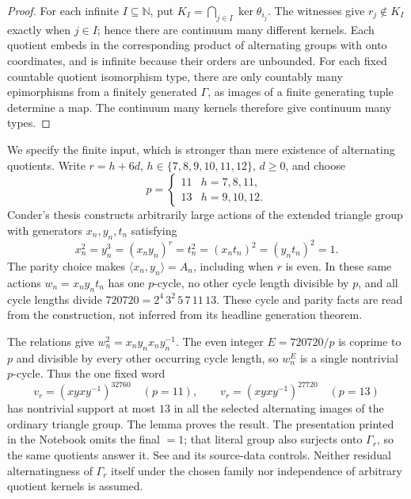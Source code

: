 \begin{proof}
For each infinite \(I\subseteq\mathbb N\), put
\(K_I=\bigcap_{j\in I}\ker\theta_{i_j}\).
The witnesses give \(r_j\notin K_I\) exactly when \(j\in I\);
hence there are continuum many different kernels.
Each quotient embeds in the corresponding product of alternating
groups with onto coordinates, and is infinite because their orders
are unbounded. For each fixed countable quotient isomorphism type,
there are only countably many epimorphisms from a finitely generated
\(\Gamma\), as images of a finite generating tuple determine a map.
The continuum many kernels therefore give continuum many types.
\end{proof}

We specify the finite input, which is stronger than mere existence
of alternating quotients.
Write \(r=h+6d\), \(h\in\{7,8,9,10,11,12\}\), \(d\ge0\), and choose
\[
 p=\begin{cases}11&h=7,8,11,\\13&h=9,10,12.\end{cases}
\]
Conder's thesis \cite[Chapter~5, pp.~117--120]{conder-thesis}
constructs arbitrarily large actions of the extended triangle group
with generators \(x_n,y_n,t_n\) satisfying
\[
 x_n^2=y_n^3=(x_ny_n)^r=t_n^2=(x_nt_n)^2=(y_nt_n)^2=1.
\]
The parity choice makes \(\langle x_n,y_n\rangle=A_n\), including
when \(r\) is even. In these same actions \(w_n=x_ny_nt_n\) has
one \(p\)-cycle, no other cycle length divisible by \(p\), and all
cycle lengths divide \(720720=2^4\,3^2\,5\,7\,11\,13\).
These cycle and parity facts are read from the construction,
not inferred from its headline generation theorem.

The relations give \(w_n^2=x_ny_nx_ny_n^{-1}\).
The even integer \(E=720720/p\) is coprime to \(p\) and divisible
by every other occurring cycle length, so \(w_n^E\) is a single
nontrivial \(p\)-cycle. Thus the one fixed word
\[
 v_r=(xyxy^{-1})^{32760}\quad(p=11),\qquad
 v_r=(xyxy^{-1})^{27720}\quad(p=13)
\]
has nontrivial support at most \(13\) in all the selected alternating
images of the ordinary triangle group.
The lemma proves the result.
The presentation printed in the Notebook omits the final \(=1\);
that literal group also surjects onto \(\Gamma_r\), so the same
quotients answer it.
See  and its source-data controls.
Neither residual alternatingness of \(\Gamma_r\) itself under the
chosen family nor independence of arbitrary quotient kernels is assumed.
